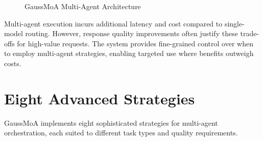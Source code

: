 \documentclass[12pt,a4paper,twoside]{report}
\begin{document}
\begin{figure}[h]
\caption{GaussMoA Multi-Agent Architecture}
\label{fig:gaussmoa-architecture}
\end{figure}

Multi-agent execution incurs additional latency and cost compared to single-model routing. However, response quality improvements often justify these trade-offs for high-value requests. The system provides fine-grained control over when to employ multi-agent strategies, enabling targeted use where benefits outweigh costs.

\section{Eight Advanced Strategies}

GaussMoA implements eight sophisticated strategies for multi-agent orchestration, each suited to different task types and quality requirements.
\end{document}
